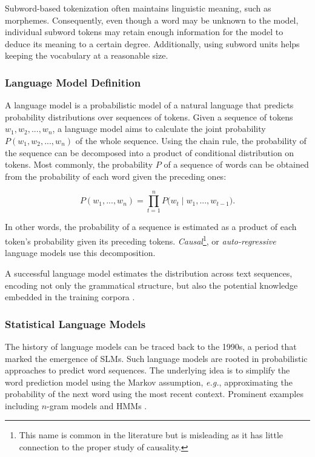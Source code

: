 Subword-based tokenization often maintains linguistic meaning, such as morphemes. Consequently, even though a word may be unknown to the model, individual subword tokens may retain enough information for the model to deduce its meaning to a certain degree. Additionally, using subword units helps keeping the vocabulary at a reasonable size.


\subsubsection{Language Model Definition}


A language model is a probabilistic model of a natural language that predicts probability distributions over sequences of tokens. Given a sequence of tokens $w_1, w_2, ..., w_n$, a language model aims to calculate the joint probability $P(w_1, w_2, ..., w_n)$ of the whole sequence. Using the chain rule, the probability of the sequence can be decomposed into a product of conditional distribution on tokens. Most commonly, the probability $P$ of a sequence of words can be obtained from the probability of each word given the preceding ones:

\begin{equation}
    P(w_1, ..., w_n) = \prod_{t=1}^{n} P\bigl(w_t \mid w_1, ..., w_{t-1}\bigr).
\label{equation:causal-distribution}
\end{equation}

In other words, the probability of a sequence is estimated as a product of each token's probability given its preceding tokens. \textit{Causal}\footnote{This name is common in the literature but is misleading as it has little connection to the proper study of causality.}, or \textit{auto-regressive} language models use this decomposition.

A successful language model estimates the distribution across text sequences, encoding not only the grammatical structure, but also the potential knowledge embedded in the training corpora \citep{jozefowicz2016exploring}.

\subsubsection{Statistical Language Models} The history of language models can be traced back to the 1990s, a period that marked the emergence of \acp{SLM}. Such language models are rooted in probabilistic approaches to predict word sequences. The underlying idea is to simplify the word prediction model using the Markov assumption, \textit{e.g.}, approximating the probability of the next word using the most recent context. Prominent examples including $n$-gram models \citep{brown1992class, omar2018arabic} and \acp{HMM} \citep{petrushin2000hidden}.

